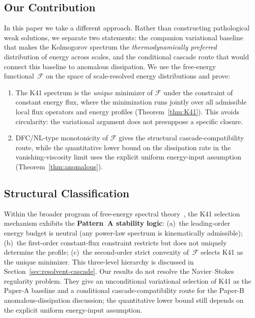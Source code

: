 \documentclass[12pt,a4paper]{article}
\theoremstyle{breakdef}
\theoremstyle{breakplain}
\theoremstyle{breakdef}
\begin{document}
\subsection{Our Contribution}

In this paper we take a different approach.  Rather than constructing
pathological weak solutions, we separate two statements: the companion
variational baseline that makes the Kolmogorov spectrum the
\emph{thermodynamically preferred} distribution of energy across scales,
and the conditional cascade route that would connect this baseline to
anomalous dissipation.  We use the free-energy functional~$\mathcal{F}$
on the space of scale-resolved energy distributions and prove:
\begin{enumerate}
  \item The K41 spectrum is the \emph{unique} minimizer of $\mathcal{F}$
        under the constraint of constant energy flux, where the minimization
        runs jointly over all admissible local flux operators and energy
        profiles (Theorem~\ref{thm:K41}).  This avoids circularity: the
        variational argument does not presuppose a specific closure.
  \item DFC/NL-type monotonicity of $\mathcal{F}$ gives the structural
        cascade-compatibility route, while the quantitative lower bound
        on the dissipation rate in the vanishing-viscosity limit uses the
        explicit uniform energy-input assumption
        (Theorem~\ref{thm:anomalous}).
\end{enumerate}

\subsection{Structural Classification}

Within the broader program of free-energy spectral
theory~\cite{FST-Unified2026}, the K41 selection mechanism exhibits the
\textbf{Pattern~A stability logic}: (a)~the leading-order energy budget is
neutral (any power-law spectrum is kinematically admissible); (b)~the
first-order constant-flux constraint restricts but does not uniquely
determine the profile; (c)~the second-order strict convexity
of~$\mathcal{F}$ selects K41 as the unique minimizer.  This three-level
hierarchy is discussed in Section~\ref{sec:resolvent-cascade}.
Our results do not resolve the Navier--Stokes regularity problem. They give
an unconditional variational selection of K41 as the Paper-A baseline and a
conditional cascade-compatibility route for the Paper-B anomalous-dissipation
discussion; the quantitative lower bound still depends on the explicit
uniform energy-input assumption.
\end{document}
